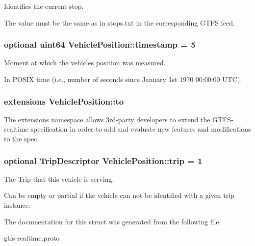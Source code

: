 Identifies the current stop. 

The value must be the same as in stops.\+txt in the corresponding G\+T\+FS feed. 
\subsubsection[{\texorpdfstring{timestamp}{timestamp}}]{\setlength{\rightskip}{0pt plus 5cm}optional uint64 Vehicle\+Position\+::timestamp = 5}\hypertarget{structVehiclePosition_acb63a32840849447f6a4dfd2f74f1907}{}\label{structVehiclePosition_acb63a32840849447f6a4dfd2f74f1907}


Moment at which the vehicle\textquotesingle{}s position was measured. 

In P\+O\+S\+IX time (i.\+e., number of seconds since January 1st 1970 00\+:00\+:00 U\+TC). 
\subsubsection[{\texorpdfstring{to}{to}}]{\setlength{\rightskip}{0pt plus 5cm}extensions Vehicle\+Position\+::to}\hypertarget{structVehiclePosition_a84bafc1fa0f1b48ed586343427f6aed7}{}\label{structVehiclePosition_a84bafc1fa0f1b48ed586343427f6aed7}


The extensions namespace allows 3rd-\/party developers to extend the G\+T\+F\+S-\/realtime specification in order to add and evaluate new features and modifications to the spec. 

\subsubsection[{\texorpdfstring{trip}{trip}}]{\setlength{\rightskip}{0pt plus 5cm}optional {\bf Trip\+Descriptor} Vehicle\+Position\+::trip = 1}\hypertarget{structVehiclePosition_a68605569650190d0c85783f544bc73d4}{}\label{structVehiclePosition_a68605569650190d0c85783f544bc73d4}


The Trip that this vehicle is serving. 

Can be empty or partial if the vehicle can not be identified with a given trip instance. 

The documentation for this struct was generated from the following file\+:\begin{DoxyCompactItemize}
\item 
gtfs-\/realtime.\+proto\end{DoxyCompactItemize}
